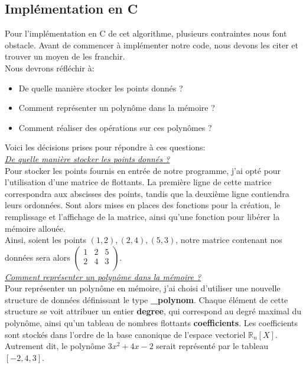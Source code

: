 \documentclass{report}
\begin{document}
\subsection{Implémentation en C}
Pour l'implémentation en C de cet algorithme, plusieurs contraintes nous font obstacle. Avant de commencer à implémenter notre code, nous devons les citer et trouver un moyen de les franchir.\vspace{6pt}\\
Nous devrons réfléchir à:
\begin{itemize}
    \item De quelle manière stocker les points donnés ?
    \item Comment représenter un polynôme dans la mémoire ?
    \item Comment réaliser des opérations sur ces polynômes ?\vspace{4pt}\\
\end{itemize}
\label{header}
Voici les décisions prises pour répondre à ces questions:\vspace{4pt}\\
\underline{\textit{De quelle manière stocker les points donnés ?}}\vspace{4pt}\\
Pour stocker les points fournis en entrée de notre programme, j'ai opté pour l'utilisation d'une matrice de flottants. La première ligne de cette matrice correspondra aux abscisses des points, tandis que la deuxième ligne contiendra leurs ordonnées. Sont alors mises en places des fonctions pour la création, le remplissage et l'affichage de la matrice, ainsi qu'une fonction pour libérer la mémoire allouée.\vspace{6pt}\\
Ainsi, soient les points $(1,2), (2,4), (5,3)$, notre matrice contenant nos données sera alors $\begin{pmatrix}
    1&2&5\\
    2&4&3\\
\end{pmatrix}$.\\
\underline{\textit{Comment représenter un polynôme dans la mémoire ?}}\vspace{4pt}\\
Pour représenter un polynôme en mémoire, j'ai choisi d'utiliser une nouvelle structure de données définissant le type \textbf{\_polynom}. Chaque élément de cette structure se voit attribuer un entier \textbf{degree}, qui correspond au degré maximal du polynôme, ainsi qu'un tableau de nombres flottants \textbf{coefficients}. Les coefficients sont stockés dans l'ordre de la base canonique de l'espace vectoriel $\mathbb{R}_n[X]$. Autrement dit, le polynôme $3x^2 + 4x - 2$ serait représenté par le tableau $[-2, 4, 3]$.\vspace{4pt}\\
\end{document}
